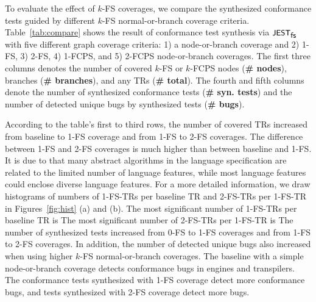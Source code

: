 To evaluate the effect of $k$-FS coverages, we compare the synthesized
conformance tests guided by different $k$-FS normal-or-branch coverage criteria.
%
Table~\ref{tab:compare} shows the result of conformance test synthesis via
$\textsf{\small JEST}_{\textsf{\small fs}}$ with five different graph coverage criteria: 1) a node-or-branch
coverage and 2) 1-FS, 3) 2-FS, 4) 1-FCPS, and 5) 2-FCPS node-or-branch
coverages.
%
The first three columns denotes the number of covered $k$-FS or $k$-FCPS nodes
(\textbf{\# nodes}), branches (\textbf{\# branches}), and any TRs (\textbf{\#
total}).
%
The fourth and fifth columns denote the number of synthesized conformance tests
(\textbf{\# syn. tests}) and the number of detected unique bugs by synthesized
tests (\textbf{\# bugs}).


According to the table's first to third rows, the number of covered
TRs increased  from baseline to 1-FS coverage and
 from 1-FS to 2-FS coverages.
%
The difference between 1-FS and 2-FS coverages is much higher than between
baseline and 1-FS.
%
It is due to that many abstract algorithms in the language specification are
related to the limited number of language features, while most language features
could enclose diverse language features.
%
For a more detailed information, we draw histograms of numbers of 1-FS-TRs per
baseline TR and 2-FS-TRs per 1-FS-TR in Figures~\ref{fig:hist} (a) and (b).
%
The most significant number of 1-FS-TRs per baseline TR is 
%
The most significant number of 2-FS-TRs per 1-FS-TR is 
%
The number of synthesized tests increased  from
0-FS to 1-FS coverages and  from 1-FS to 2-FS
coverages.
%
In addition, the number of detected unique bugs also increased when using higher
$k$-FS normal-or-branch coverages.
%
The baseline with a simple node-or-branch coverage detects 
conformance bugs in engines and transpilers.
%
The conformance tests synthesized with 1-FS coverage detect 
more conformance bugs, and tests synthesized with 2-FS coverage detect  more bugs.


